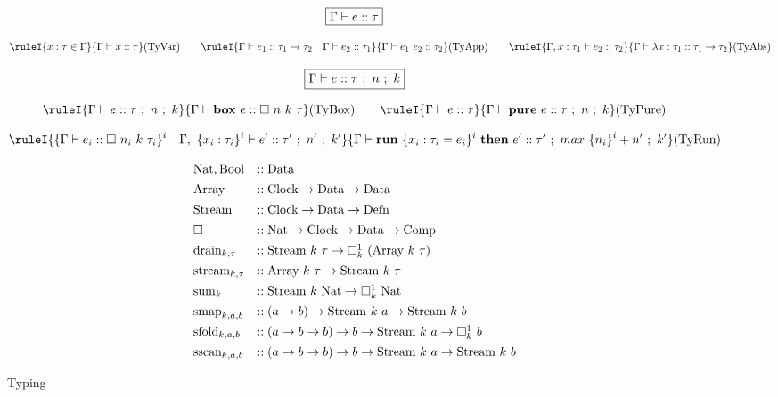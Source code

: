 \begin{figure*}
$$
\boxed{\Gamma \vdash e :: \tau}
$$

$$
\ruleI
{       x : \tau \in \Gamma
}
{       \JudgeT{\Gamma}{x}{\tau}
}
\textrm{(TyVar)}
\quad\quad
\ruleI
{       \JudgeT{\Gamma}{e_1}{\tau_1 \to \tau_2}
        \quad
        \JudgeT{\Gamma}{e_2}{\tau_1}
}
{       \JudgeT{\Gamma}{e_1~e_2}{\tau_2}       
}
\textrm{(TyApp)}
\quad\quad
\ruleI
{       \JudgeT{\Gamma,x:\tau_1}{e_2}{\tau_2}
}
{       \JudgeT{\Gamma}{\lambda x : \tau_1}{\tau_1 \to \tau_2}
}
\textrm{(TyAbs)}
$$



$$
\boxed{\Gamma \vdash e :: \tau ~;~ n ~;~ k}
$$

$$
\ruleI
{       \JudgeTS{\Gamma}{e}{\tau}{n}{k}
}
{       \JudgeT{\Gamma}{\kbox~ e}{\Box~ n~ k~ \tau}
}
\textrm{(TyBox)}
\quad\quad
\ruleI
{       \JudgeT{\Gamma}{e}{\tau}
}
{       \JudgeTS{\Gamma}{\kpure~e}{\tau}{n}{k}
}
\textrm{(TyPure)}
$$

$$
\ruleI
{       \{ \JudgeT
                {\Gamma}{e_i}{\Box~ n_i~ k~ \tau_i} \}^i 
        \quad
        \JudgeTS
                {\Gamma,~ \{x_i : \tau_i \}^i}
                {e'}{\tau'}{n'}{k'}
}
{       \JudgeTS
                {\Gamma}
                {\krun~ \{ x_i : \tau_i = e_i \}^i ~\kthen~ e'}
                {\tau'}
                {max~ \{ n_i \}^i + n'}
                {k'}
}
\textrm{(TyRun)}
$$

\vspace{2em}
$$
\begin{array}{ll}
\rNat,\rBool      & :: \rData
\\[1ex]
%
\rArray           & :: \rClock \to \rData \to \rData
\\[1ex]
%
\rStream          & :: \rClock \to \rData \to \rDefn
\\[1ex]
%
\Box              & :: \rNat   \to \rClock \to \rData \to \rComp
\\[1ex]
%
\rdrain_{k,\tau}  & :: \rStream~k~\tau \to \Box^1_k~ (\rArray~ k~ \tau)
\\[1ex]
%
\rstream_{k,\tau} & :: \rArray~k~\tau  \to \rStream~k~\tau
\\[1ex]
%
\rsum_k           & :: \rStream~k~\rNat \to \Box^1_k~ \rNat
\\[1ex]
%
\rsmap_{k,a,b}    & :: (a \to b) \to \rStream~k~a \to \rStream~k~b
\\[1ex]
%
\rsfold_{k,a,b}   & :: (a \to b \to b) \to b \to \rStream~k~a \to \Box^1_k~ b
\\[1ex]
%
\rsscan_{k,a,b}   & :: (a \to b \to b) \to b \to \rStream~k~a \to \rStream~k~b
\end{array}
$$

\caption{Typing}
\label{fig:source:type:modal}
\end{figure*}
